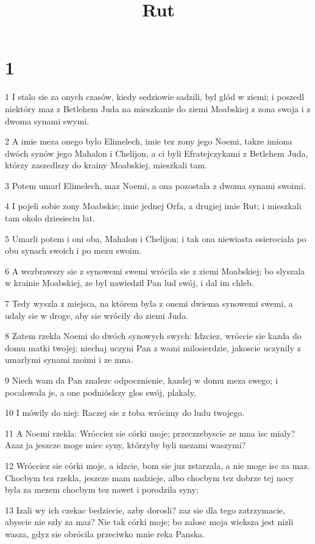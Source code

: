 

\title{Rut}


\chapter{1}

\par 1 I stalo sie za onych czasów, kiedy sedziowie sadzili, byl glód w ziemi; i poszedl niektóry maz z Betlehem Juda na mieszkanie do ziemi Moabskiej z zona swoja i z dwoma synami swymi.
\par 2 A imie meza onego bylo Elimelech, imie tez zony jego Noemi, takze imiona dwóch synów jego Mahalon i Chelijon, a ci byli Efratejczykami z Betlehem Juda, którzy zaszedlszy do krainy Moabskiej, mieszkali tam.
\par 3 Potem umarl Elimelech, maz Noemi, a ona pozostala z dwoma synami swoimi.
\par 4 I pojeli sobie zony Moabskie; imie jednej Orfa, a drugiej imie Rut; i mieszkali tam okolo dziesieciu lat.
\par 5 Umarli potem i oni oba, Mahalon i Chelijon; i tak ona niewiasta osierociala po obu synach swoich i po mezu swoim.
\par 6 A wezbrawszy sie z synowemi swemi wrócila sie z ziemi Moabskiej; bo slyszala w krainie Moabskiej, ze byl nawiedzil Pan lud swój, i dal im chleb.
\par 7 Tedy wyszla z miejsca, na którem byla z onemi dwiema synowemi swemi, a udaly sie w droge, aby sie wrócily do ziemi Juda.
\par 8 Zatem rzekla Noemi do dwóch synowych swych: Idzciez, wróccie sie kazda do domu matki twojej; niechaj uczyni Pan z wami milosierdzie, jakoscie uczynily z umarlymi synami moimi i ze mna.
\par 9 Niech wam da Pan znalezc odpocznienie, kazdej w domu meza swego; i pocalowala je, a one podnióslszy glos swój, plakaly,
\par 10 I mówily do niej: Raczej sie z toba wrócimy do ludu twojego.
\par 11 A Noemi rzekla: Wrócciez sie córki moje; przeczzebyscie ze mna isc mialy? Azaz ja jeszcze moge miec syny, którzyby byli mezami waszymi?
\par 12 Wrócciez sie córki moje, a idzcie, bom sie juz zstarzala, a nie moge isc za maz. Chocbym tez rzekla, jeszcze mam nadzieje, albo chocbym tez dobrze tej nocy byla za mezem chocbym tez nawet i porodzila syny;
\par 13 Izali wy ich czekac bedziecie, azby dorosli? zaz sie dla tego zatrzymacie, abyscie nie szly za maz? Nie tak córki moje; bo zalosc moja wieksza jest nizli wasza, gdyz sie obrócila przeciwko mnie reka Panska.
